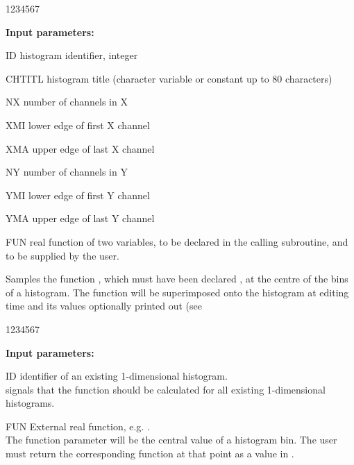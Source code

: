 \begin{DLtt}{1234567}
\item[{\rm\bf Input parameters:}]
\item[ID] histogram identifier, integer
\item[CHTITL] histogram title  (character variable or constant up to 80
          characters)
\item[NX] number of channels in X
\item[XMI] lower edge of first X channel
\item[XMA] upper edge of last X channel
\item[NY] number of channels in Y
\item[YMI] lower edge of first Y channel
\item[YMA] upper edge of last Y channel
\item[FUN] real function of two variables, to be declared
 in the calling subroutine, and to be supplied by the user.
\end{DLtt}


\Action Samples the function , which must have been declared
,
at the centre of the bins of a histogram. The function will be
superimposed onto the histogram at editing time and its values optionally
printed out (see 
\begin{DLtt}{1234567}
\item[{\rm\bf Input parameters:}]
\item[ID] identifier of an existing 1-dimensional histogram.\\
           signals that the function should be calculated
          for all existing 1-dimensional histograms.
\item[FUN] External real function, e.g. .\\
          The function parameter 
          will be the central value of a histogram bin. 
          The user must return
          the corresponding function at that point as a value in .
\end{DLtt}

